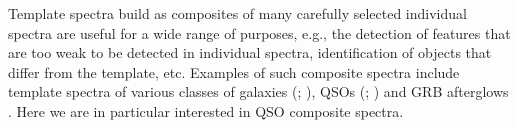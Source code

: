 \documentclass{aa}    %
\newcommand{\sectionname}{Section}
\newcommand{\Sect}[1]{\sectionname~\ref{sect:#1}}
\newcommand{\sect}[1]{\Sect{#1}}
\newcommand{\todo}[3]{{\color{#2}\emph{#1}: #3}}
\newcommand{\jstodo}[1]{\todo{ \\TODO }{green}{#1}}
\newcommand{\qtodo}[1]{\todo{\\ Question}{red}{#1}}
\begin{document}
%
%
%
%
%
%
%
%
%
%
%
%
%
%

Template spectra build as composites of many carefully selected individual spectra
are useful for a wide range of purposes, e.g., the detection
of features that are too weak to be detected in individual spectra,
identification of objects that differ from the template, etc. Examples of such
composite spectra include template spectra of various classes of galaxies
(\cite{Shapley2003}; \cite{Dobos2012}), QSOs (\citep{CristianiS.andVio1990, Boyle1990, Francis1991, Zheng1997, Brotherton2000};
\citep{VandenBerk2001, Telfer2002, Richards2006a, Glikman2006}) and GRB afterglows \citep{Christensen2011}.
Here we are in particular interested in  
QSO composite spectra.
\end{document}
